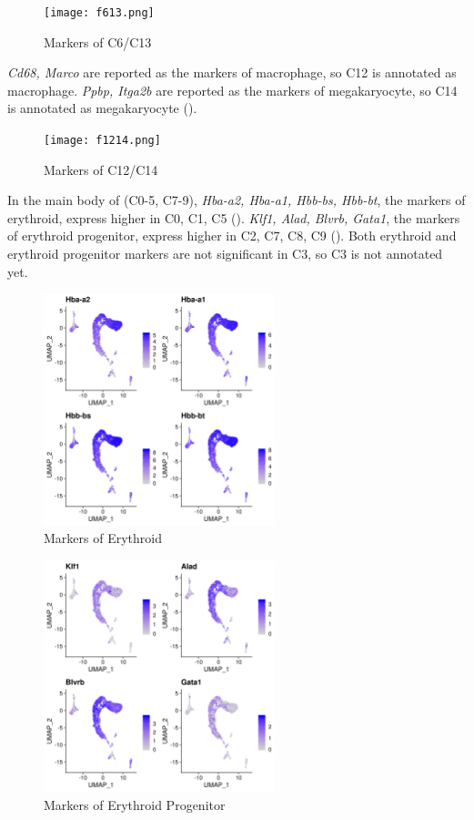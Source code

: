 \documentclass[lang=en]{elegantpaper}
\begin{document}
\begin{figure}[htbp]
    \centering
    \texttt{[image: f613.png]}
    \caption{Markers of C6/C13 \label{f613}}
\end{figure}

\emph{Cd68, Marco} are reported as the markers of macrophage\citep{su_single-cell_2017, han_mapping_2018}, so C12 is annotated as macrophage. \emph{Ppbp, Itga2b} are reported as the markers of megakaryocyte\citep{su_single-cell_2017}, so C14 is annotated as megakaryocyte ().

\begin{figure}[htbp]
    \centering
    \texttt{[image: f1214.png]}
    \caption{Markers of C12/C14 \label{f1214}}
\end{figure}

In the main body of  (C0-5, C7-9), \emph{Hba-a2, Hba-a1, Hbb-bs, Hbb-bt}, the markers of erythroid\citep{han_mapping_2018}, express higher in C0, C1, C5 (). \emph{Klf1, Alad, Blvrb, Gata1}, the markers of erythroid progenitor\citep{han_mapping_2018}, express higher in C2, C7, C8, C9 (). Both erythroid and erythroid progenitor markers are not significant in C3, so C3 is not annotated yet.

\begin{figure}[htbp]
    \centering
    \includegraphics[width=0.6\textwidth]{image/fe.png}
    \caption{Markers of Erythroid \label{fe}}
\end{figure}
\begin{figure}[htbp]
    \centering
    \includegraphics[width=0.6\textwidth]{image/fep.png}
    \caption{Markers of Erythroid Progenitor\label{fep}}
\end{figure}
\end{document}
